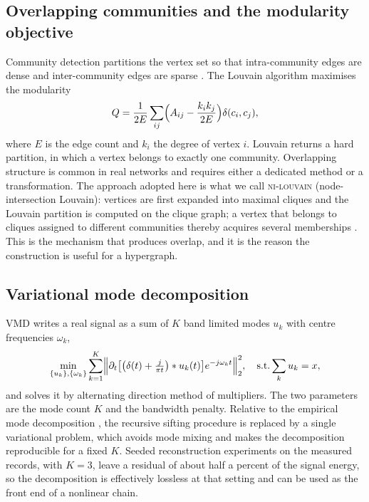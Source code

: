 \documentclass[10pt,a4paper,twocolumn]{article}
\newcommand{\nilouvain}{\textsc{ni-louvain}}
\begin{document}
\subsection{Overlapping communities and the modularity objective}

Community detection partitions the vertex set so that intra-community edges
are dense and inter-community edges are sparse
\citep{girvan2002,newman2004,newman2006,fortunato2010}.  The Louvain
algorithm \citep{blondel2008} maximises the modularity
\begin{equation}
Q = \frac{1}{2E}\sum_{ij}\Bigl(A_{ij} -
\frac{k_i k_j}{2E}\Bigr)\delta(c_i,c_j),
\label{eq:mod}
\end{equation}
where $E$ is the edge count and $k_i$ the degree of vertex $i$.  Louvain
returns a hard partition, in which a vertex belongs to exactly one community.
Overlapping structure is common in real networks and requires either a
dedicated method or a transformation.  The approach adopted here is what we
call \nilouvain{} (node-intersection Louvain): vertices are first expanded
into maximal cliques and the Louvain partition is computed on the clique
graph; a vertex that belongs to cliques assigned to different communities
thereby acquires several memberships \citep{palla2005,ahn2010}.  This is the
mechanism that produces overlap, and it is the reason the construction is
useful for a hypergraph.

\subsection{Variational mode decomposition}

VMD \citep{dragomiretskiy2014} writes a real signal as a sum of $K$ band
limited modes $u_k$ with centre frequencies $\omega_k$,
\begin{equation}
\min_{\{u_k\},\{\omega_k\}} \sum_{k=1}^{K}
\Bigl\lVert \partial_t\bigl[\bigl(\delta(t) +
\tfrac{j}{\pi t}\bigr)\ast u_k(t)\bigr] e^{-j\omega_k t}
\Bigr\rVert_2^2 ,
\quad \text{s.t.} \sum_k u_k = x ,
\label{eq:vmd}
\end{equation}
and solves it by alternating direction method of multipliers.  The two
parameters are the mode count $K$ and the bandwidth penalty.  Relative to the
empirical mode decomposition \citep{huang1998}, the recursive sifting
procedure is replaced by a single variational problem, which avoids mode
mixing and makes the decomposition reproducible for a fixed $K$.  Seeded
reconstruction experiments on the measured records, with $K=3$, leave a
residual of about half a percent of the signal energy, so the decomposition
is effectively lossless at that setting and can be used as the front end of a
nonlinear chain.
\end{document}
